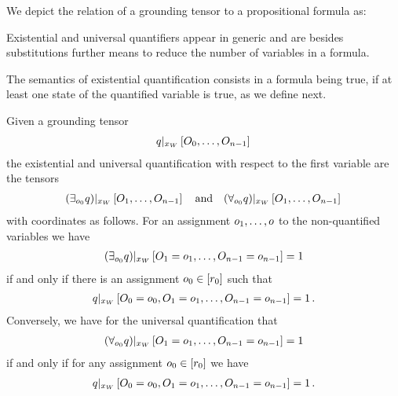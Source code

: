 We depict the relation of a grounding tensor to a propositional formula as:
\begin{center}
    
\end{center}



Existential and universal quantifiers appear in generic \firstOrderLogic{} and are besides substitutions further means to reduce the number of variables in a formula.


The semantics of existential quantification consists in a formula being true, if at least one state of the quantified variable is true, as we define next.

\begin{definition}
    Given a grounding tensor
    \begin{align*}
        {q}|_{x_{W}} \left[O_{0},\ldots,O_{n-1}\right] \,
    \end{align*}
    the existential and universal quantification with respect to the first variable are the tensors
    \begin{align*}
        {\left(\exists_{o_{0}}q\right)}|_{x_{W}} \left[O_{1},\ldots,O_{n-1}\right] \quad \text{and} \quad
        {\left(\forall_{o_{0}}q\right)}|_{x_{W}} \left[O_{1},\ldots,O_{n-1}\right] \,
    \end{align*}
    with coordinates as follows.
    For an assignment $o_{1},\ldots,o$ to the non-quantified variables we have
    \begin{align*}
        {\left(\exists_{o_{0}}q\right)}|_{x_{W}} \left[O_{1}=o_{1},\ldots,O_{n-1}=o_{n-1}\right] = 1
    \end{align*}
    if and only if there is an assignment $o_{0}\in[r_{0}]$ such that
    \begin{align*}
        {q}|_{x_{W}} \left[O_{0}=o_{0},O_{1}=o_{1},\ldots,O_{n-1}=o_{n-1}\right] = 1 \, .
    \end{align*}
    Conversely, we have for the universal quantification that
    \begin{align*}
        {\left(\forall_{o_{0}}q\right)}|_{x_{W}} \left[O_{1}=o_{1},\ldots,O_{n-1}=o_{n-1}\right] = 1
    \end{align*}
    if and only if for any assignment $o_{0}\in[r_{0}]$ we have
    \begin{align*}
        {q}|_{x_{W}} \left[O_{0}=o_{0},O_{1}=o_{1},\ldots,O_{n-1}=o_{n-1}\right] = 1 \, .
    \end{align*}
\end{definition}


